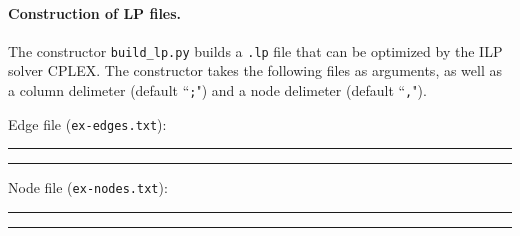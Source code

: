 \documentclass[12pt,twoside]{reedthesis}
\theoremstyle{definition}
\begin{document}
        \paragraph{Construction of LP files.}The constructor \verb|build_lp.py| builds a \texttt{.lp} file that can be optimized by the ILP solver CPLEX. The constructor takes the following files as arguments, as well as a column delimeter (default ``\texttt{;}") and a node delimeter (default ``\texttt{,}").

        Edge file (\texttt{ex-edges.txt}):\\
        \rule{\textwidth}{1pt}
        
        \rule{\textwidth}{1pt}

        \newpage

        Node file (\texttt{ex-nodes.txt}):\\
        \rule{\textwidth}{1pt}
        
        \rule{\textwidth}{1pt}

        \newpage
\end{document}
